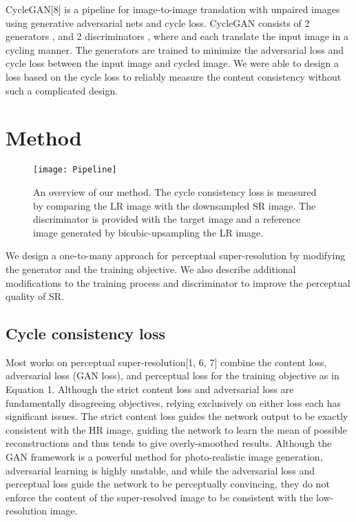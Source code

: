 \documentclass{article}
\begin{document}
CycleGAN[8] is a pipeline for image-to-image translation with unpaired images using generative adversarial nets and cycle loss. CycleGAN consists of 2 generators , and 2 discriminators , where  and  each translate the input image in a cycling manner. The generators are trained to minimize the adversarial loss and cycle loss  between the input image and cycled image.
We were able to design a loss based on the cycle loss to reliably measure the content consistency without such a complicated design.

\section{Method}
\label{headings}


\begin{figure}
  \centering
  \texttt{[image: Pipeline]}
  \caption{An overview of our method. The cycle consistency loss is measured by comparing the LR image with the downsampled SR image. The discriminator is provided with the target image and a reference image generated by bicubic-upsampling the LR image.}
\end{figure}

We design a one-to-many approach for perceptual super-resolution by modifying the generator and the training objective. We also describe additional modifications to the training process and discriminator to improve the perceptual quality of SR.

\subsection{Cycle consistency loss}

Most works on perceptual super-resolution[1, 6, 7] combine the content loss, adversarial loss (GAN loss), and perceptual loss for the training objective as in Equation 1. Although the strict content loss and adversarial loss are fundamentally disagreeing objectives, relying exclusively on either loss each has significant issues. The strict content loss guides the network output to be exactly consistent with the HR image, guiding the network to learn the mean of possible reconstructions and thus tends to give overly-smoothed results. Although the GAN framework is a powerful method for photo-realistic image generation, adversarial learning is highly unstable, and while the adversarial loss and perceptual loss guide the network to be perceptually convincing, they do not enforce the content of the super-resolved image to be consistent with the low-resolution image.
\end{document}
